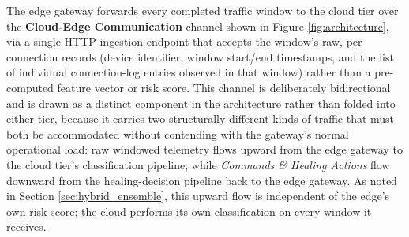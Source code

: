 The edge gateway forwards every completed traffic window to the cloud tier over the \textbf{Cloud-Edge Communication} channel shown in Figure \ref{fig:architecture}, via a single HTTP ingestion endpoint that accepts the window's raw, per-connection records (device identifier, window start/end timestamps, and the list of individual connection-log entries observed in that window) rather than a pre-computed feature vector or risk score. This channel is deliberately bidirectional and is drawn as a distinct component in the architecture rather than folded into either tier, because it carries two structurally different kinds of traffic that must both be accommodated without contending with the gateway's normal operational load: raw windowed telemetry flows upward from the edge gateway to the cloud tier's classification pipeline, while \textit{Commands \& Healing Actions} flow downward from the healing-decision pipeline back to the edge gateway. As noted in Section \ref{sec:hybrid_ensemble}, this upward flow is independent of the edge's own risk score; the cloud performs its own classification on every window it receives.

